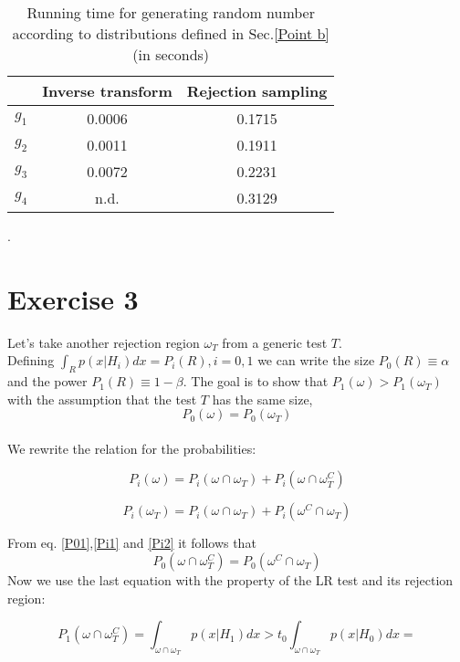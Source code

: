\documentclass{article}
\begin{document}
\begin{table}[]
    \centering
    \begin{tabular}{c|c|c}
    & \textbf{Inverse transform} & \textbf{Rejection sampling} \\
    \hline
    $g_1$ & 0.0006  & 0.1715  \\
    $g_2$ & 0.0011  & 0.1911 \\
    $g_3$ & 0.0072  & 0.2231 \\
    $g_4$ & n.d. & 0.3129 \\
    \end{tabular}
    \caption{Running time for generating random number according to distributions defined in Sec.\ref{Point b} (in seconds)}.
    \label{tab:my_label}
\end{table}

\section{Exercise 3}
 Let's take another rejection region $\omega_T$ from a generic test $T$.\\ Defining $\int_R{p(x|H_i)dx}=P_i(R),i=0,1$ we can write the size $P_0(R) \equiv \alpha$ and the power $P_1(R) \equiv 1-\beta$. The goal is to show that $P_1(\omega)>P_1(\omega_T)$ with the assumption that the test $T$ has the same size, 
 \begin{equation}
     P_0(\omega)=P_0(\omega_T)
     \label{P01}
 \end{equation}\\
 We rewrite the relation for the probabilities:

 \begin{equation}
     P_i(\omega)=P_i(\omega \cap \omega_T)+P_i(\omega \cap \omega_T^C)
     \label{Pi1}
 \end{equation}

 \begin{equation}
     P_i(\omega_T)=P_i(\omega \cap \omega_T)+P_i(\omega^C \cap \omega_T)
     \label{Pi2}
 \end{equation}

From eq. \ref{P01},\ref{Pi1} and \ref{Pi2} it follows that 
\begin{equation}
    P_0(\omega \cap \omega_T^C)=P_0(\omega^C \cap \omega_T)
    \label{P02}
\end{equation}
Now we use the last equation with the property of the LR test and its rejection region:

\begin{equation*}
    P_1(\omega \cap \omega_T^C)=\int_{\omega \cap \omega_T}{p(x|H_1)dx} > t_0 \int_{\omega \cap \omega_T}{p(x|H_0)dx} = 
\end{equation*}
\end{document}
